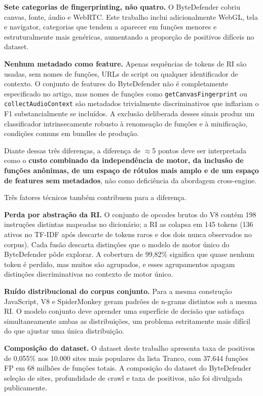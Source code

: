 \textbf{Sete categorias de fingerprinting, não quatro.} O ByteDefender
cobriu canvas, fonte, áudio e WebRTC. Este trabalho inclui adicionalmente WebGL,
tela e navigator, categorias que tendem a aparecer em funções menores e
estruturalmente mais genéricas, aumentando a proporção de positivos difíceis no
dataset.

\textbf{Nenhum metadado como feature.} Apenas sequências de tokens de RI são
usadas, sem nomes de funções, URLs de script ou qualquer identificador de
contexto. O conjunto de features do ByteDefender não é completamente especificado
no artigo, mas nomes de funções como \texttt{getCanvasFingerprint} ou
\texttt{collectAudioContext} são metadados trivialmente discriminativos que
inflariam o F1 substancialmente se incluídos. A exclusão deliberada desses sinais
produz um classificador intrinsecamente robusto à renomeação de funções e à
minificação, condições comuns em bundles de produção.

Diante dessas três diferenças, a diferença de $\approx$5 pontos deve ser
interpretada como o \textbf{custo combinado da independência de motor, da inclusão
de funções anônimas, de um espaço de rótulos mais amplo e de um espaço de features
sem metadados}, não como deficiência da abordagem cross-engine.

Três fatores técnicos também contribuem para a diferença.

\textbf{Perda por abstração da RI.} O conjunto de opcodes brutos do V8 contém 198
instruções distintas mapeadas no dicionário; a RI as colapsa em 145 tokens (136 ativos
no TF-IDF após descarte de tokens raros e dos dois nunca observados no corpus).
Cada fusão descarta distinções que o modelo de motor único do ByteDefender pôde
explorar. A cobertura de 99,82\% significa que quase nenhum token é perdido, mas
muitos são agrupados, e esses agrupamentos apagam distinções discriminativas no
contexto de motor único.

\textbf{Ruído distribucional do corpus conjunto.} Para a mesma construção
JavaScript, V8 e SpiderMonkey geram padrões de n-grams distintos sob a mesma RI.
O modelo conjunto deve aprender uma superfície de decisão que satisfaça
simultaneamente ambas as distribuições, um problema estritamente mais difícil do
que ajustar uma única distribuição.

\textbf{Composição do dataset.} O dataset deste trabalho apresenta taxa de
positivos de 0,055\% nos 10.000 sites mais populares da lista Tranco, com 37.644
funções FP em 68 milhões de funções totais. A composição do dataset do ByteDefender
seleção de sites, profundidade de crawl e taxa de positivos, não foi
divulgada publicamente.

